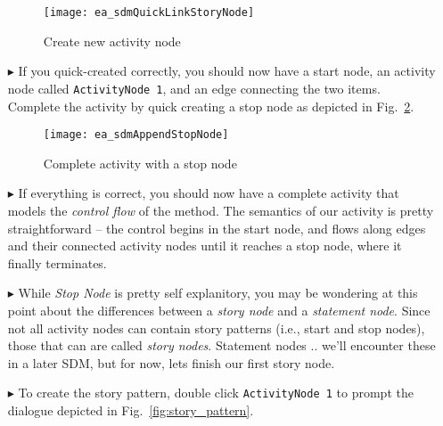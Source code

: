 \begin{itemize}
\begin{figure}[htp]
\begin{center}
  \texttt{[image: ea\_sdmQuickLinkStoryNode]}
  \caption{Create new activity node}  
  \label{fig:sdm_new_activity_node}
\end{center}
\end{figure}

\item[$\blacktriangleright$] If you quick-created correctly, you should now have a start node, an activity node called \texttt{ActivityNode 1}, and an edge
connecting the two items. Complete the activity by quick creating a stop node as depicted in Fig.~\ref{fig:sdm_stop_node}.

\begin{figure}[htp]
\begin{center}
  \texttt{[image: ea\_sdmAppendStopNode]}
  \caption{Complete activity with a stop node}  
  \label{fig:sdm_stop_node}
\end{center}
\end{figure}

\vspace{0.5cm}

\item[$\blacktriangleright$] If everything is correct, you should now have a complete activity that models the \emph{control flow} of the method. 
The semantics of our activity is pretty straightforward -- the control begins in the start node, and flows along edges and their connected activity nodes until
it reaches a stop node, where it finally terminates. 

\vspace{0.5cm}

\item[$\blacktriangleright$] While \emph{Stop Node} is pretty self explanitory, you may be wondering at this point about the differences between a \emph{story
node} and a \emph{statement node}. Since not all activity nodes can contain story patterns (i.e., start and stop nodes), those that can are called \emph{story
nodes}. Statement nodes .. we'll encounter these in a later SDM, but for now, lets finish our first story node.

\vspace{0.5cm}

\item[$\blacktriangleright$] To create the story pattern, double click \texttt{ActivityNode 1} to prompt the dialogue depicted in Fig.~\ref{fig:story_pattern}.


\end{itemize}
